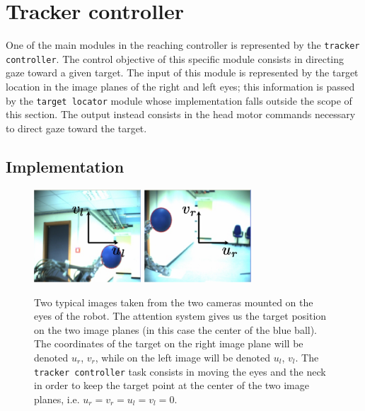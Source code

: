 \section{Tracker controller}
\label{Sec:TrackerController}

One of the main modules in the reaching controller is represented by the {\tt tracker controller}. The control objective of this specific module consists in directing gaze toward a given target. The input of this module is represented by the target location in the image planes of the right and left eyes; this information is passed by the {\tt target locator} module whose implementation falls outside the scope of this section. The output instead consists in the head motor commands necessary to direct gaze toward the target. 

\subsection{Implementation}

\begin{figure}[tbp]
\centering
\includegraphics[width=40mm]{Figure/LeftImage.eps} \hspace{1cm}
\includegraphics[width=40mm]{Figure/RightImage.eps}
\caption{Two typical images taken from the two cameras mounted on the eyes of the robot. The attention system gives us the target position on the two image planes (in this case the center of the blue ball). The coordinates of the target on the right image plane will be denoted $u_r$, $v_r$, while on the left image will be denoted $u_l$, $v_l$. The {\tt tracker controller} task consists in moving the eyes and the neck in order to keep the target point at the center of the two image planes, i.e. $u_r = v_r = u_l = v_l = 0$.}
\label{Fig:ImagePlane}
\end{figure}
 
